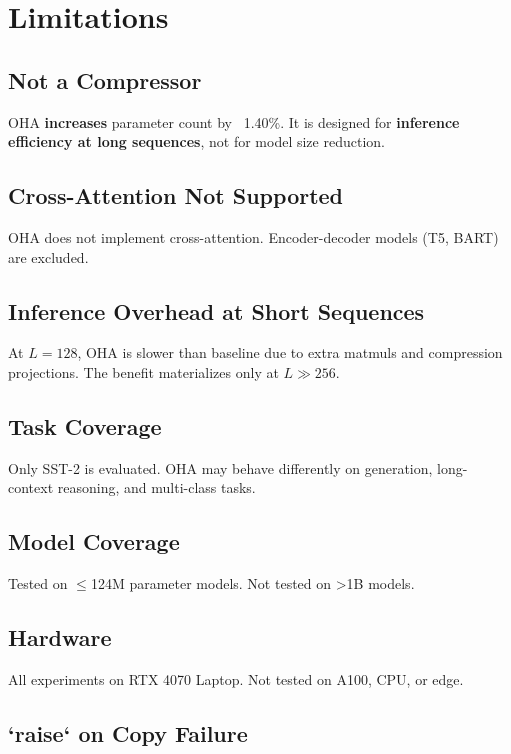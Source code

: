 
\section{Limitations}

\subsection{Not a Compressor}

OHA \textbf{increases} parameter count by ~1.40\%. It is designed for 
\textbf{inference efficiency at long sequences}, not for model size reduction.

\subsection{Cross-Attention Not Supported}

OHA does not implement cross-attention. Encoder-decoder models (T5, BART) 
are excluded.

\subsection{Inference Overhead at Short Sequences}

At $L = 128$, OHA is slower than baseline due to extra matmuls and 
compression projections. The benefit materializes only at $L \gg 256$.

\subsection{Task Coverage}

Only SST-2 is evaluated. OHA may behave differently on generation, 
long-context reasoning, and multi-class tasks.

\subsection{Model Coverage}

Tested on $\le$124M parameter models. Not tested on >1B models.

\subsection{Hardware}

All experiments on RTX 4070 Laptop. Not tested on A100, CPU, or edge.

\subsection{`raise` on Copy Failure}

